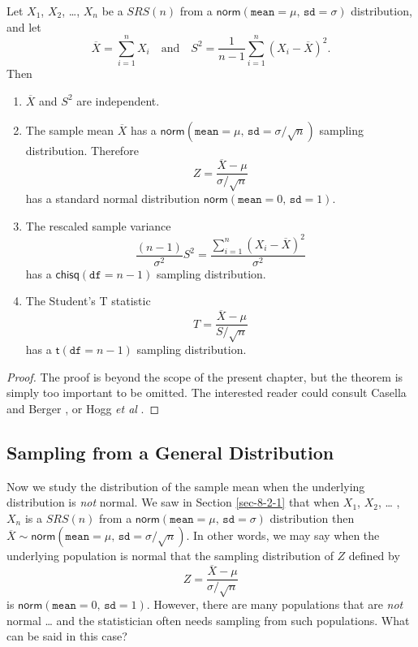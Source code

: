 \begin{thm}
\label{thm-Xbar-andS} Let \(X_{1}\), \(X_{2}\), \ldots{}, \(X_{n}\) be a
\(SRS(n)\) from a
\(\mathsf{norm}(\mathtt{mean}=\mu,\,\mathtt{sd}=\sigma)\)
distribution, and let
\begin{equation}
\overline{X}=\sum_{i=1}^{n}X_{i}\quad \mbox{and}\quad S^{2}=\frac{1}{n-1}\sum_{i=1}^{n}(X_{i}-\overline{X})^{2}.
\end{equation}
Then
\begin{enumerate}
\item
\(\overline{X}\) and \(S^{2}\) are independent.
\item
The sample mean \(\overline{X}\) has a \(\mathsf{norm}(\mathtt{mean}=\mu,\,\mathtt{sd}=\sigma/\sqrt{n})\) sampling distribution.
Therefore
\begin{equation}
Z=\frac{\overline{X}-\mu}{\sigma/\sqrt{n}}
\end{equation}
has a standard normal distribution \(\mathsf{norm}(\mathtt{mean}=0,\,\mathtt{sd}=1)\). 
\item The rescaled sample variance
\begin{equation}
\frac{(n-1)}{\sigma^{2}}S^{2}=\frac{\sum_{i=1}^{n}(X_{i}-\overline{X})^{2}}{\sigma^{2}}
\end{equation}
has a \(\mathsf{chisq}(\mathtt{df}=n-1)\) sampling distribution.
\item
The Student's T statistic
\begin{equation}
T=\frac{\overline{X}-\mu}{S/\sqrt{n}}
\end{equation}
has a \(\mathsf{t}(\mathtt{df}=n-1)\) sampling distribution.
\end{enumerate}
\end{thm}

\begin{proof}
The proof is beyond the scope of the present chapter, but the theorem is
simply too important to be omitted. The interested reader could
consult Casella and Berger \cite{Casella2002}, or Hogg \emph{et al}
\cite{Hogg2005}.
\end{proof}

\subsection{Sampling from a General Distribution}

Now we study the distribution of the sample mean when the underlying distribution is \emph{not} normal.
We saw in Section \ref{sec-8-2-1} that when \(X_{1}\), \(X_{2}\), \ldots{} , \(X_{n}\) is a \(SRS(n)\) from a
\(\mathsf{norm}(\mathtt{mean}=\mu,\,\mathtt{sd}=\sigma)\) distribution
then \(\overline{X} \sim \mathsf{norm}(\mathtt{mean} =
\mu,\,\mathtt{sd} = \sigma/\sqrt{n})\). In other words, we may say
when the underlying
population is normal that the sampling distribution of \(Z\) defined
by
\begin{equation}
Z=\frac{\overline{X}-\mu}{\sigma/\sqrt{n}}
\end{equation}
is \(\mathsf{norm}(\mathtt{mean}=0,\,\mathtt{sd}=1)\). 
However, there are many populations that are \emph{not} normal \ldots{} and the
statistician often needs sampling from such populations.
What can be said in this case?

